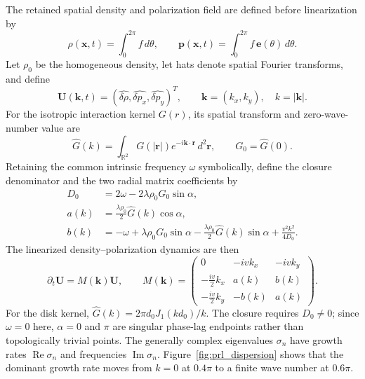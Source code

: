\documentclass[aps,prl,reprint,superscriptaddress,nofootinbib,floatfix]{revtex4-2}
\begin{document}
The retained spatial density and polarization field are defined before linearization by
\begin{equation}
  \rho(\mathbf x,t)=\int_0^{2\pi}f\,d\theta,
  \qquad
  \mathbf p(\mathbf x,t)=\int_0^{2\pi}f\,\mathbf e(\theta)\,d\theta .
  \label{eq:prl_moments}
\end{equation}
Let $\rho_0$ be the homogeneous density, let hats denote spatial Fourier transforms, and define
\begin{equation}
  \mathbf U(\mathbf k,t)=
  (\widehat{\delta\rho},\widehat{\delta p_x},\widehat{\delta p_y})^T,
  \qquad \mathbf k=(k_x,k_y),\quad k=|\mathbf k| .
  \label{eq:prl_state}
\end{equation}
For the isotropic interaction kernel $G(r)$, its spatial transform and zero-wave-number value are
\begin{equation}
  \widehat G(k)=\int_{\mathbb R^2}G(|\mathbf r|)e^{-i\mathbf k\cdot\mathbf r}\,d^2\mathbf r,
  \qquad G_0=\widehat G(0).
  \label{eq:prl_kernel}
\end{equation}
Retaining the common intrinsic frequency $\omega$ symbolically, define the closure denominator and the two radial matrix coefficients by
\begin{align}
  D_0&=2\omega-2\lambda\rho_0G_0\sin\alpha,\nonumber\\
  a(k)&=\frac{\lambda\rho_0}{2}\widehat G(k)\cos\alpha,\nonumber\\
  b(k)&=-\omega+\lambda\rho_0G_0\sin\alpha
  -\frac{\lambda\rho_0}{2}\widehat G(k)\sin\alpha
  +\frac{v^2k^2}{4D_0}.
  \label{eq:prl_radial_coefficients}
\end{align}
The linearized density--polarization dynamics are then
\begin{equation}
  \partial_t\mathbf U=M(\mathbf k)\mathbf U,\qquad
  M(\mathbf k)=
  \begin{pmatrix}
  0 & -ivk_x & -ivk_y\\
  -\frac{iv}{2}k_x & a(k) & b(k)\\
  -\frac{iv}{2}k_y & -b(k) & a(k)
  \end{pmatrix}.
  \label{eq:prl_M}
\end{equation}
For the disk kernel, $\widehat G(k)=2\pi d_0J_1(kd_0)/k$. The closure requires $D_0\ne0$; since $\omega=0$ here, $\alpha=0$ and $\pi$ are singular phase-lag endpoints rather than topologically trivial points. The generally complex eigenvalues $\sigma_n$ have growth rates $\operatorname{Re}\sigma_n$ and frequencies $\operatorname{Im}\sigma_n$. Figure~\ref{fig:prl_dispersion} shows that the dominant growth rate moves from $k=0$ at $0.4\pi$ to a finite wave number at $0.6\pi$.
\end{document}
